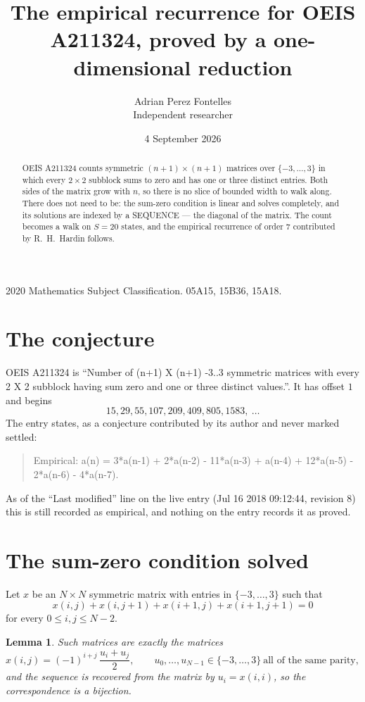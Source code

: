 \documentclass[11pt,a4paper]{article}
\title{The empirical recurrence for OEIS A211324, proved by a one-dimensional reduction}
\author{Adrian Perez Fontelles\\ \small Independent researcher}
\date{4 September 2026}
\theoremstyle{plain}
\newtheorem{lemma}[theorem]{Lemma}
\theoremstyle{definition}
\begin{document}
\maketitle

\begin{abstract}
OEIS A211324 counts symmetric $(n+1)\times(n+1)$ matrices over
$\{-3,\dots,3\}$ in which every $2\times2$ subblock sums to zero and has one or three distinct
entries. Both sides of the matrix grow with $n$, so there is no slice of bounded width to walk
along. There does not need to be: the sum-zero condition is linear and solves completely, and
its solutions are indexed by a SEQUENCE --- the diagonal of the matrix. The count becomes a walk
on $S=20$ states, and the empirical recurrence of order $7$ contributed by R.~H.~Hardin
follows.
\end{abstract}

\noindent\small 2020 Mathematics Subject Classification. 05A15, 15B36, 15A18.\normalsize

\section{The conjecture}

OEIS A211324 is ``Number of (n+1) X (n+1) -3..3 symmetric matrices with every 2 X 2 subblock having sum zero and one or three distinct values.''. It has offset $1$ and begins
\[
15, 29, 55, 107, 209, 409, 805, 1583,\ \dots
\]
The entry states, as a conjecture contributed by its author and never marked settled:
\begin{quote}
Empirical: a(n) = 3*a(n-1) + 2*a(n-2) - 11*a(n-3) + a(n-4) + 12*a(n-5) - 2*a(n-6) - 4*a(n-7).
\end{quote}
As of the ``Last modified'' line on the live entry (Jul 16 2018 09:12:44, revision 8) this is still
recorded as empirical, and nothing on the entry records it as proved.

\section{The sum-zero condition solved}

Let $x$ be an $N\times N$ symmetric matrix with entries in $\{-3,\dots,3\}$ such that
\[
x(i,j)+x(i,j{+}1)+x(i{+}1,j)+x(i{+}1,j{+}1)=0
\]
for every $0\le i,j\le N-2$.

\begin{lemma}\label{lem:solve}
Such matrices are exactly the matrices
\[
x(i,j)=(-1)^{i+j}\,\frac{u_i+u_j}{2},
\qquad u_0,\dots,u_{N-1}\in\{-3,\dots,3\}\ \text{all of the same parity},
\]
and the sequence is recovered from the matrix by $u_i=x(i,i)$, so the correspondence is a
bijection.
\end{lemma}
\end{document}
